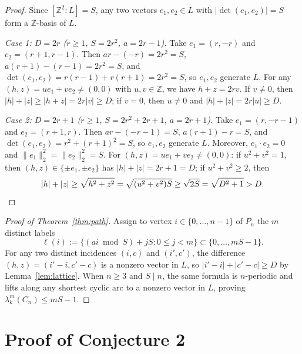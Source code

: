 \documentclass[11pt]{article}
\begin{document}
\begin{proof}
Since $[\mathbb{Z}^2 : L] = S$, any two vectors $e_1, e_2 \in L$ with $|\det(e_1, e_2)| = S$ form a $\mathbb{Z}$-basis of $L$.

\emph{Case 1: $D = 2r$ ($r \ge 1$, $S = 2r^2$, $a = 2r - 1$).} Take $e_1 = (r, -r)$ and $e_2 = (r+1, r-1)$. Then $ar - (-r) = 2r^2 = S$, $a(r+1) - (r-1) = 2r^2 = S$, and $\det(e_1, e_2) = r(r-1) + r(r+1) = 2r^2 = S$, so $e_1, e_2$ generate $L$. For any $(h, z) = u e_1 + v e_2 \neq (0, 0)$ with $u, v \in \mathbb{Z}$, we have $h + z = 2rv$. If $v \neq 0$, then $|h| + |z| \ge |h + z| = 2r|v| \ge D$; if $v = 0$, then $u \neq 0$ and $|h| + |z| = 2r|u| \ge D$.

\emph{Case 2: $D = 2r + 1$ ($r \ge 1$, $S = 2r^2 + 2r + 1$, $a = 2r + 1$).} Take $e_1 = (r, -r-1)$ and $e_2 = (r+1, r)$. Then $ar - (-r-1) = S$, $a(r+1) - r = S$, and $\det(e_1, e_2) = r^2 + (r+1)^2 = S$, so $e_1, e_2$ generate $L$. Moreover, $e_1 \cdot e_2 = 0$ and $\|e_1\|_2^2 = \|e_2\|_2^2 = S$. For $(h, z) = u e_1 + v e_2 \neq (0, 0)$: if $u^2 + v^2 = 1$, then $(h, z) \in \{\pm e_1, \pm e_2\}$ has $|h| + |z| = 2r + 1 = D$; if $u^2 + v^2 \ge 2$, then
\[
|h| + |z| \ge \sqrt{h^2 + z^2} = \sqrt{(u^2 + v^2)S} \ge \sqrt{2S} = \sqrt{D^2 + 1} > D. \qedhere
\]
\end{proof}

\begin{proof}[Proof of Theorem~\ref{thm:path}]
Assign to vertex $i \in \{0, \dots, n-1\}$ of $P_n$ the $m$ distinct labels
\[
\ell(i) := \{(ai \bmod S) + jS : 0 \le j < m\} \subset \{0, \dots, mS - 1\}.
\]
For any two distinct incidences $(i, c)$ and $(i', c')$, the difference $(h, z) = (i' - i, c' - c)$ is a nonzero vector in $L$, so $|i' - i| + |c' - c| \ge D$ by Lemma~\ref{lem:lattice}. When $n \ge 3$ and $S \mid n$, the same formula is $n$-periodic and lifts along any shortest cyclic arc to a nonzero vector in $L$, proving $\lambda_k^m(C_n) \le mS - 1$.
\end{proof}

\section{Proof of Conjecture 2}
\end{document}

